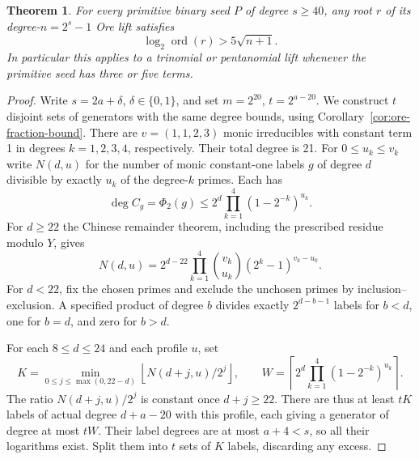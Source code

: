 \documentclass[11pt]{article}
\newtheorem{theorem}{Theorem}
\newcommand{\ord}{\operatorname{ord}}
\begin{document}
\begin{theorem}\label{thm:ore-uniform-five}
For every primitive binary seed \(P\) of degree \(s\ge40\), any root
\(r\) of its degree-\(n=2^s-1\) Ore lift satisfies
\[
                    \log_2\ord(r)>5\sqrt{n+1}.
\]
In particular this applies to a trinomial or pentanomial lift whenever
the primitive seed has three or five terms.
\end{theorem}
\begin{proof}
Write \(s=2a+\delta\), \(\delta\in\{0,1\}\), and set \(m=2^{20}\),
\(t=2^{a-20}\). We construct \(t\) disjoint sets of generators with the
same degree bounds, using Corollary~\ref{cor:ore-fraction-bound}.
There are \(v=(1,1,2,3)\) monic irreducibles with constant term 1 in
degrees \(k=1,2,3,4\), respectively. Their total degree is 21.
For \(0\le u_k\le v_k\) write \(N(d,u)\) for the number of monic
constant-one labels \(g\) of degree \(d\) divisible by exactly \(u_k\)
of the degree-\(k\) primes. Each has
\[
 \deg C_g=\Phi_2(g)\le 2^d\prod_{k=1}^4(1-2^{-k})^{u_k}.
\]
For \(d\ge22\) the Chinese remainder theorem, including the prescribed
residue modulo \(Y\), gives
\[
 N(d,u)=2^{d-22}\prod_{k=1}^4 {v_k\choose u_k}(2^k-1)^{v_k-u_k}.
\]
For \(d<22\), fix the chosen primes and exclude the unchosen primes
by inclusion--exclusion. A specified product of degree \(b\) divides
exactly \(2^{d-b-1}\) labels for \(b<d\), one for \(b=d\), and zero
for \(b>d\).

For each \(8\le d\le24\) and each profile \(u\), set
\[
 K=\min_{0\le j\le\max(0,22-d)}
        \left\lfloor N(d+j,u)/2^j\right\rfloor,\qquad
 W=\left\lceil 2^d\prod_{k=1}^4(1-2^{-k})^{u_k}\right\rceil .
\]
The ratio \(N(d+j,u)/2^j\) is constant once \(d+j\ge22\).
There are thus at least \(tK\) labels of actual degree \(d+a-20\)
with this profile, each giving a generator of degree at most \(tW\).
Their label degrees are at most \(a+4<s\), so all their logarithms
exist. Split them into \(t\) sets of \(K\) labels, discarding any excess.


\end{proof}
\end{document}
